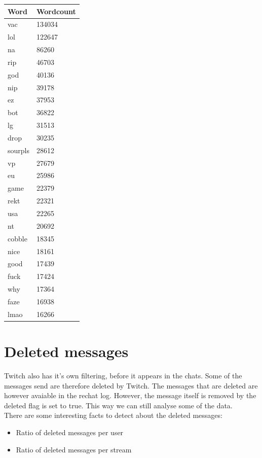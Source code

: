 \documentclass[final]{report}
\begin{document}
\begin{minipage}{.5\textwidth}
\centering
{}
\label{wordcounttabel}
\begin{tabular}{|l|l|}
\hline
Word    & Wordcount \\ \hline
vac     & 134034    \\ \hline
lol     & 122647    \\ \hline
na      & 86260     \\ \hline
rip     & 46703     \\ \hline
god     & 40136     \\ \hline
nip     & 39178     \\ \hline
ez      & 37953     \\ \hline
bot     & 36822     \\ \hline
lg      & 31513     \\ \hline
drop    & 30235     \\ \hline
sourpls & 28612     \\ \hline
vp      & 27679     \\ \hline
eu      & 25986     \\ \hline
game    & 22379     \\ \hline
rekt    & 22321     \\ \hline
usa     & 22265     \\ \hline
nt      & 20692     \\ \hline
cobble  & 18345     \\ \hline
nice    & 18161     \\ \hline
good    & 17439     \\ \hline
fuck    & 17424     \\ \hline
why     & 17364     \\ \hline
faze    & 16938     \\ \hline
lmao    & 16266     \\ \hline
\end{tabular}

\end{minipage}

\section{Deleted messages}

Twitch also has it's own filtering, before it appears in the chats. Some of the messages send are therefore deleted by Twitch. The messages that are deleted are however avaiable in the rechat log. However, the message itself is removed by the deleted flag is set to true. This way we can still analyse some of the data.\\
There are some interesting facts to detect about the deleted messages:
\begin{itemize}
	\item Ratio of deleted messages per user
	\item Ratio of deleted messages per stream
\end{itemize}
\end{document}
